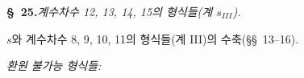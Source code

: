 
\begin{center}\textbf{\S\ 25.}\quad\emph{계수차수 12, 13, 14, 15의 형식들(계 $s_{III}$).}\end{center}
$s$와 계수차수 8, 9, 10, 11의 형식들(계 III)의 수축(\S\S\ 13--16).

\noindent\emph{환원 불가능 형식들:}
